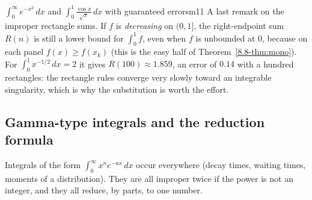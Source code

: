 \documentclass[11pt]{article}
\begin{document}
\begin{exmp}{$\displaystyle\int_0^\infty e^{-x^2}\,dx$ and $\displaystyle\int_0^1\frac{\cos x}{\sqrt x}\,dx$ with guaranteed errors}{m11}
A last remark on the improper rectangle sums. If $f$ is \emph{decreasing} on $(0,1]$, the right-endpoint sum $R(n)$ is still a lower bound for $\int_0^1f$, even when $f$ is unbounded at $0$, because on each panel $f(x)\ge f(x_k)$ (this is the easy half of Theorem~\ref{8.8-thm:mono}). For $\int_0^1x^{-1/2}\,dx=2$ it gives $R(100)\approx1.859$, an error of $0.14$ with a hundred rectangles: the rectangle rules converge very slowly toward an integrable singularity, which is why the substitution is worth the effort.
\end{exmp}

\subsection*{Gamma-type integrals and the reduction formula}

Integrals of the form $\int_0^\infty x^ne^{-ax}\,dx$ occur everywhere (decay times, waiting times, moments of a distribution). They are all improper twice if the power is not an integer, and they all reduce, by parts, to one number.
\end{document}
